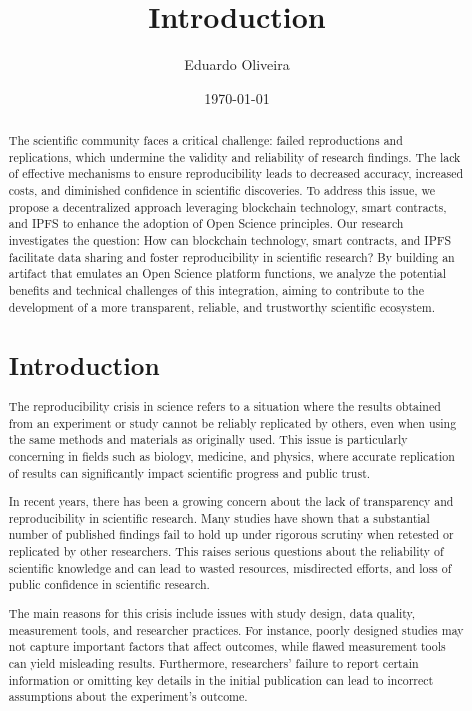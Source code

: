 \documentclass{article}
\title{Introduction}
\author{Eduardo Oliveira}
\date{\today}
\begin{document}
\maketitle

\begin{abstract}

\begin{abstract}
    The scientific community faces a critical challenge: failed reproductions and replications, which undermine the validity and reliability of research findings. The lack of effective mechanisms to ensure reproducibility leads to decreased accuracy, increased costs, and diminished confidence in scientific discoveries. To address this issue, we propose a decentralized approach leveraging blockchain technology, smart contracts, and IPFS to enhance the adoption of Open Science principles. Our research investigates the question: How can blockchain technology, smart contracts, and IPFS facilitate data sharing and foster reproducibility in scientific research? By building an artifact that emulates an Open Science platform functions, we analyze the potential benefits and technical challenges of this integration, aiming to contribute to the development of a more transparent, reliable, and trustworthy scientific ecosystem.
\end{abstract}


\section{Introduction}


The reproducibility crisis in science refers to a situation where the results obtained from an experiment or study cannot be reliably replicated by others, even when using the same methods and materials as originally used. This issue is particularly concerning in fields such as biology, medicine, and physics, where accurate replication of results can significantly impact scientific progress and public trust.

In recent years, there has been a growing concern about the lack of transparency and reproducibility in scientific research. Many studies have shown that a substantial number of published findings fail to hold up under rigorous scrutiny when retested or replicated by other researchers. This raises serious questions about the reliability of scientific knowledge and can lead to wasted resources, misdirected efforts, and loss of public confidence in scientific research.

The main reasons for this crisis include issues with study design, data quality, measurement tools, and researcher practices. For instance, poorly designed studies may not capture important factors that affect outcomes, while flawed measurement tools can yield misleading results. Furthermore, researchers’ failure to report certain information or omitting key details in the initial publication can lead to incorrect assumptions about the experiment's outcome.


\end{abstract}
\end{document}
